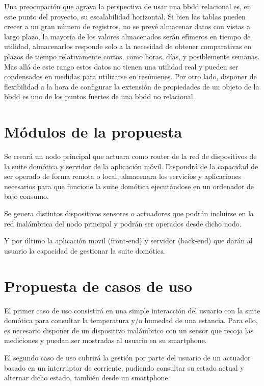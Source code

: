 Una preocupación que agrava la perspectiva de usar una \gls{bbdd} relacional es, en este punto del proyecto, su escalabilidad horizontal. Si bien las tablas pueden crecer a un gran número de registros, no se prevé almacenar datos con vistas a largo plazo, la mayoría de los valores almacenados serán efímeros en tiempo de utilidad, almacenarlos responde solo a la necesidad de obtener comparativas en plazos de tiempo relativamente cortos, como horas, días, y posiblemente semanas. Mas allá de este rango estos datos no tienen una utilidad real y pueden ser condensados en medidas para utilizarse en resúmenes. Por otro lado, disponer de flexibilidad a la hora de configurar la extensión de propiedades de un objeto de la \gls{bbdd} es uno de los puntos fuertes de una \gls{bbdd} no relacional.

\vspace{1.5cm}


\section{Módulos de la propuesta}
\label{ch:Capitulo3.2}

Se creará un nodo principal que actuara como router de la red de dispositivos de la suite domótica y servidor de la aplicación móvil. Dispondrá de la capacidad de ser operado de forma remota o local, almacenara los servicios y aplicaciones necesarios para que funcione la suite domótica ejecutándose en un ordenador de bajo consumo.

Se genera distintos dispositivos sensores o actuadores que podrán incluirse en la red inalámbrica del nodo principal y podrán ser operados desde dicho nodo.

Y por último la aplicación movil (front-end) y servidor (back-end) que darán al usuario la capacidad de gestionar la suite domótica.

\section{Propuesta de casos de uso}
\label{ch:Capitulo3.3}

El primer caso de uso consistirá en una simple interacción del usuario con la suite domótica para consultar la temperatura y/o humedad de una estancia. Para ello, es necesario disponer de un dispositivo inalámbrico con un sensor que recoja las mediciones y puedan ser mostradas al usuario en su smartphone.

El segundo caso de uso cubrirá la gestión por parte del usuario de un actuador basado en un interruptor de corriente, pudiendo consultar su estado actual y alternar dicho estado, también desde un smartphone.


